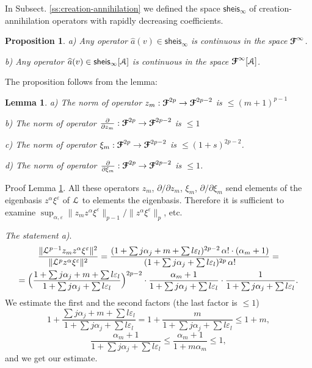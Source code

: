 \documentclass[]{amsart}
\newcounter{sec}
\newtheorem{proposition}[theorem]{Proposition}
\newtheorem{lemma}[theorem]{Lemma}
\def\epsilon{\varepsilon}
\def\le{\leqslant}
\def\cA{\EuScript A}
\def\cF{\EuScript F}
\def\cL{\EuScript L}
\def\ccF{\boldsymbol {\cF}}
\def\wh{\widehat}
\def\sm{\smallskip}
\def\sheis{\mathsf{sheis}}
\begin{document}
\sm


In Subsect. \ref{ss:creation-annihilation} we defined the space
$\sheis_\infty$ of creation-annihilation operators with rapidly decreasing
coefficients.
 
	

\begin{proposition}
{\rm a)} Any operator $\wh a(v)\in \sheis_\infty$  is continuous in
  the space $\ccF^\infty$. 	

\sm

{\rm b)} Any operator $\wh a(v)\in \sheis_\infty[\cA]$ 
is continuous in the space $\ccF^\infty[\cA]$. 
	\end{proposition}
	

	
The proposition follows from the lemma: 

\begin{lemma}
	\label{l:norms-creation}
	{\rm a)}  The norm of operator $z_m:\ccF^{2p}\to\ccF^{2p-2}$
	is $\le  (m+1)^{p-1}$
	
	\sm
	
	{\rm b)} The norm of operator $\frac\partial{\partial {z_m}}:\ccF^{2p}\to\ccF^{2p-2}$
	is $\le 1$
	
	\sm 
	
{\rm c)} The norm of operator $\xi_m:\ccF^{2p}\to\ccF^{2p-2}$	is $\le (1+s)^{2p-2}$.


\sm 

{\rm d)} The norm of operator $\frac\partial{\partial \xi_m}:\ccF^{2p}\to\ccF^{2p-2}$	
is $\le 1$.	
\end{lemma}	

{\sc Proof Lemma \ref{l:norms-creation}.} All these operators $z_m$, $\partial/\partial z_m$,
$\xi_m$, $\partial/\partial \xi_m$  send elements of the eigenbasis $z^\alpha \xi^\epsilon$ of  $\cL$
to elements the eigenbasis. Therefore it is sufficient to examine
$\sup_{\alpha,\epsilon}\|z_m z^\alpha \xi^\epsilon\|_{p-1}/ 
\|z^\alpha \xi^\epsilon\|_p$, etc.

\sm

{\it The statement  a)}.
\begin{multline*}
\frac{\|\cL^{p-1}z_m z^\alpha \xi^\epsilon\|^2}
{\|\cL^p z^\alpha \xi^\epsilon\|^2}=
\frac{(1+\sum j\alpha_j+m+\sum l\epsilon_l)^{2p-2}\,\alpha!\cdot(\alpha_m+1)}
{(1+\sum j\alpha_j+\sum l\epsilon_l)^{2p}\,\alpha!}
=\\=
\Bigl(\frac{1+\sum j\alpha_j+m+\sum l\epsilon_l}
{1+\sum j\alpha_j+\sum l\epsilon_l} \Bigr)^{2p-2} 
\cdot \frac{\alpha_m+1}{1+\sum j\alpha_j+\sum l\epsilon_l}\cdot
\frac{1}{1+\sum j\alpha_j+\sum l\epsilon_l}.
\end{multline*} 
We estimate the first and the second factors (the last factor is $\le 1$)
$$
1+\frac{\sum j\alpha_j+m+\sum l\epsilon_l}
{1+\sum j\alpha_j+\sum l\epsilon_l}
=1+\frac{m}{{1+\sum j\alpha_j+\sum l\epsilon_l}}\le 1+m,
$$
$$
\frac{\alpha_m+1}{1+\sum j\alpha_j+\sum l\epsilon_l}\le \frac{\alpha_m+1}{1+m\alpha_m}\le 1,
$$
and we get our estimate.
\end{document}
